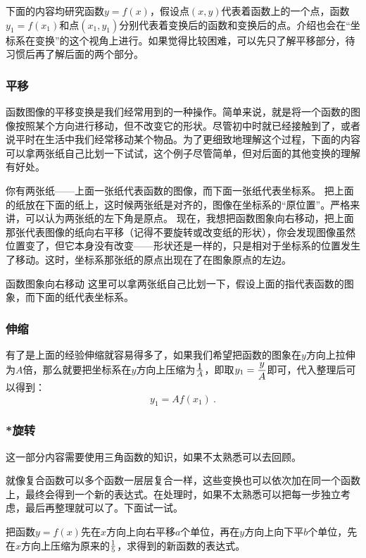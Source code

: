 下面的内容均研究函数$y=f(x)$，假设点$(x,y)$代表着函数上的一个点，函数$y_1=f(x_1)$和点$(x_1,y_1)$分别代表着变换后的函数和变换后的点。介绍也会在“坐标系在变换”的这个视角上进行。如果觉得比较困难，可以先只了解平移部分，待习惯后再了解后面的两个部分。

\subsubsection{平移}

函数图像的平移变换是我们经常用到的一种操作。简单来说，就是将一个函数的图像按照某个方向进行移动，但不改变它的形状。尽管初中时就已经接触到了，或者说平时在生活中我们经常移动某个物品。为了更细致地理解这个过程，下面的内容可以拿两张纸自己比划一下试试，这个例子尽管简单，但对后面的其他变换的理解有好处。

你有两张纸——上面一张纸代表函数的图像，而下面一张纸代表坐标系。
把上面的纸放在下面的纸上，这时候两张纸是对齐的，图像在坐标系的“原位置”。严格来讲，可以认为两张纸的左下角是原点。
现在，我想把函数图象向右移动，把上面那张代表图像的纸向右平移（记得不要旋转或改变纸的形状），你会发现图像虽然位置变了，但它本身没有改变——形状还是一样的，只是相对于坐标系的位置发生了移动。这时，坐标系那张纸的原点出现在了在图象原点的左边。


函数图象向右移动
这里可以拿两张纸自己比划一下，假设上面的指代表函数的图象，而下面的纸代表坐标系。

\subsubsection{伸缩}

有了是上面的经验伸缩就容易得多了，如果我们希望把函数的图象在$y$方向上拉伸为$A$倍，那么就要把坐标系在$y$方向上压缩为$\displaystyle 1\over A$，即取$\displaystyle y_1={y\over A}$即可，代入整理后可以得到：
\begin{equation}
y_1=Af(x_1)~.
\end{equation}

\subsubsection{*旋转}

这一部分内容需要使用三角函数的知识，如果不太熟悉可以去回顾。

就像复合函数可以多个函数一层层复合一样，这些变换也可以依次加在同一个函数上，最终会得到一个新的表达式。在处理时，如果不太熟悉可以把每一步独立考虑，最后再整理就可以了。下面试一试。
\begin{exercise}{把函数$y=f(x)$先在$x$方向上向右平移$a$个单位，再在$y$方向上向下平$b$个单位，先在$x$方向上压缩为原来的$1\over5$，求得到的新函数的表达式。}

\end{exercise}

